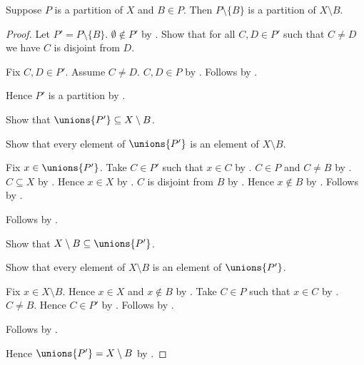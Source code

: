 \begin{proposition}\label{partition_remove_block}
    Suppose $P$ is a partition of $X$ and $B\in P$.
    Then $P\setminus\{B\}$ is a partition of $X\setminus B$.
\end{proposition}
\begin{proof}
    Let $P'=P\setminus\{B\}$.
    $\emptyset\notin P'$ by .
    Show that for all $C,D\in P'$ such that $C\neq D$ we have
        $C$ is disjoint from $D$.
    \begin{subproof}
        Fix $C,D\in P'$.
        Assume $C\neq D$.
        $C,D\in P$ by .
        Follows by .
    \end{subproof}
    Hence $P'$ is a partition by .

    Show that $\unions{P'}\subseteq X\setminus B$.
    \begin{subproof}
        Show that every element of $\unions{P'}$ is an element of
            $X\setminus B$.
        \begin{subproof}
            Fix $x\in\unions{P'}$.
            Take $C\in P'$ such that $x\in C$ by .
            $C\in P$ and $C\neq B$ by
                .
            $C\subseteq X$ by .
            Hence $x\in X$ by .
            $C$ is disjoint from $B$ by .
            Hence $x\notin B$ by .
            Follows by .
        \end{subproof}
        Follows by .
    \end{subproof}
    Show that $X\setminus B\subseteq\unions{P'}$.
    \begin{subproof}
        Show that every element of $X\setminus B$ is an element of
            $\unions{P'}$.
        \begin{subproof}
            Fix $x\in X\setminus B$.
            Hence $x\in X$ and $x\notin B$ by .
            Take $C\in P$ such that $x\in C$ by
                .
            $C\neq B$.
            Hence $C\in P'$ by .
            Follows by .
        \end{subproof}
        Follows by .
    \end{subproof}
    Hence $\unions{P'}=X\setminus B$ by
        .
\end{proof}

